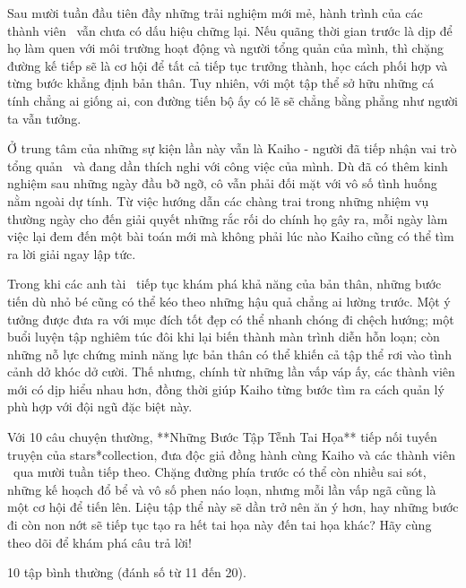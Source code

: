 \documentclass[main.tex]{subfiles}
\begin{document}
Sau mười tuần đầu tiên đầy những trải nghiệm mới mẻ, hành trình của các thành viên \hls\  vẫn chưa có dấu hiệu chững lại. Nếu quãng thời gian trước là dịp để họ làm quen với môi trường hoạt động và người tổng quản của mình, thì chặng đường kế tiếp sẽ là cơ hội để tất cả tiếp tục trưởng thành, học cách phối hợp và từng bước khẳng định bản thân. Tuy nhiên, với một tập thể sở hữu những cá tính chẳng ai giống ai, con đường tiến bộ ấy có lẽ sẽ chẳng bằng phẳng như người ta vẫn tưởng.

Ở trung tâm của những sự kiện lần này vẫn là Kaiho - người đã tiếp nhận vai trò tổng quản \hls\  và đang dần thích nghi với công việc của mình. Dù đã có thêm kinh nghiệm sau những ngày đầu bỡ ngỡ, cô vẫn phải đối mặt với vô số tình huống nằm ngoài dự tính. Từ việc hướng dẫn các chàng trai trong những nhiệm vụ thường ngày cho đến giải quyết những rắc rối do chính họ gây ra, mỗi ngày làm việc lại đem đến một bài toán mới mà không phải lúc nào Kaiho cũng có thể tìm ra lời giải ngay lập tức.

Trong khi các anh tài \hls\  tiếp tục khám phá khả năng của bản thân, những bước tiến dù nhỏ bé cũng có thể kéo theo những hậu quả chẳng ai lường trước. Một ý tưởng được đưa ra với mục đích tốt đẹp có thể nhanh chóng đi chệch hướng; một buổi luyện tập nghiêm túc đôi khi lại biến thành màn trình diễn hỗn loạn; còn những nỗ lực chứng minh năng lực bản thân có thể khiến cả tập thể rơi vào tình cảnh dở khóc dở cười. Thế nhưng, chính từ những lần vấp váp ấy, các thành viên mới có dịp hiểu nhau hơn, đồng thời giúp Kaiho từng bước tìm ra cách quản lý phù hợp với đội ngũ đặc biệt này.

Với 10 câu chuyện thường, **Những Bước Tập Tễnh Tai Họa** tiếp nối tuyến truyện của stars*collection, đưa độc giả đồng hành cùng Kaiho và các thành viên \hls\  qua mười tuần tiếp theo. Chặng đường phía trước có thể còn nhiều sai sót, những kế hoạch đổ bể và vô số phen náo loạn, nhưng mỗi lần vấp ngã cũng là một cơ hội để tiến lên. Liệu tập thể này sẽ dần trở nên ăn ý hơn, hay những bước đi còn non nớt sẽ tiếp tục tạo ra hết tai họa này đến tai họa khác? Hãy cùng theo dõi để khám phá câu trả lời!

{} 10 tập bình thường (đánh số từ 11 đến 20).
\end{document}
